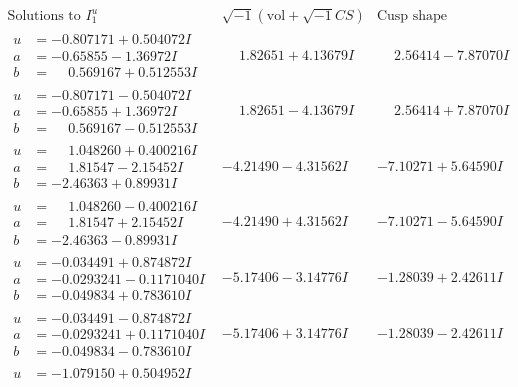 \documentclass[1p]{elsarticle_modified}
\theoremstyle{definition}
\newcommand{\I}{\sqrt{-1}}
\begin{document}
$$\begin{array}{c|c|c}  
\text{Solutions to }I^u_{1}& \I (\text{vol} + \sqrt{-1}CS) & \text{Cusp shape}\\
 \hline 
\begin{aligned}
u &= -0.807171 + 0.504072 I \\
a &= -0.65855 - 1.36972 I \\
b &= \phantom{-}0.569167 + 0.512553 I\end{aligned}
 & \phantom{-}1.82651 + 4.13679 I & \phantom{-}2.56414 - 7.87070 I \\ \hline\begin{aligned}
u &= -0.807171 - 0.504072 I \\
a &= -0.65855 + 1.36972 I \\
b &= \phantom{-}0.569167 - 0.512553 I\end{aligned}
 & \phantom{-}1.82651 - 4.13679 I & \phantom{-}2.56414 + 7.87070 I \\ \hline\begin{aligned}
u &= \phantom{-}1.048260 + 0.400216 I \\
a &= \phantom{-}1.81547 - 2.15452 I \\
b &= -2.46363 + 0.89931 I\end{aligned}
 & -4.21490 - 4.31562 I & -7.10271 + 5.64590 I \\ \hline\begin{aligned}
u &= \phantom{-}1.048260 - 0.400216 I \\
a &= \phantom{-}1.81547 + 2.15452 I \\
b &= -2.46363 - 0.89931 I\end{aligned}
 & -4.21490 + 4.31562 I & -7.10271 - 5.64590 I \\ \hline\begin{aligned}
u &= -0.034491 + 0.874872 I \\
a &= -0.0293241 - 0.1171040 I \\
b &= -0.049834 + 0.783610 I\end{aligned}
 & -5.17406 - 3.14776 I & -1.28039 + 2.42611 I \\ \hline\begin{aligned}
u &= -0.034491 - 0.874872 I \\
a &= -0.0293241 + 0.1171040 I \\
b &= -0.049834 - 0.783610 I\end{aligned}
 & -5.17406 + 3.14776 I & -1.28039 - 2.42611 I \\ \hline\begin{aligned}
u &= -1.079150 + 0.504952 I \\

\end{aligned}
\end{array}$$
\end{document}
